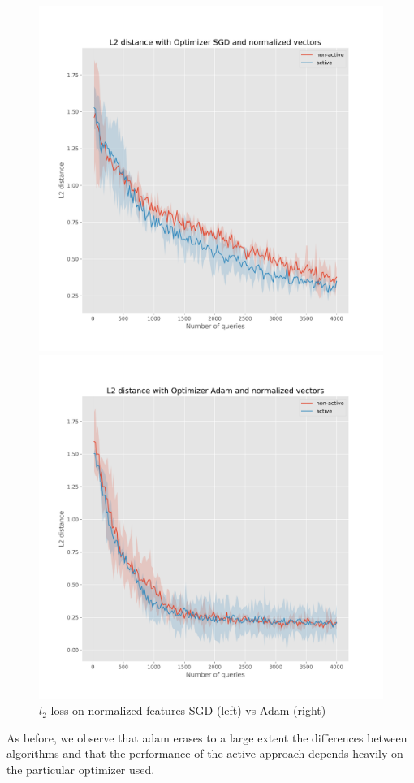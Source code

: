 \documentclass{article}
\begin{document}
\begin{figure}[t]
  \centering
  \begin{minipage}{.45\textwidth}
    \centering
    \includegraphics[width=\linewidth]{active-vs-base-moons-l2-loss-SGD-normalized-ci}
  \end{minipage}%
  \begin{minipage}{.45\textwidth}
    \centering
    \includegraphics[width=\linewidth]{active-vs-base-moons-l2-loss-Adam-normalized-ci}
  \end{minipage}
  \caption{$l_2$ loss on normalized features SGD (left) vs Adam (right)}\label{fig:l2-loss-normalized-ci}
\end{figure}
As before, we observe that adam erases to a large extent the differences between algorithms and that the performance
of the active approach depends heavily on the particular optimizer used.
\end{document}
